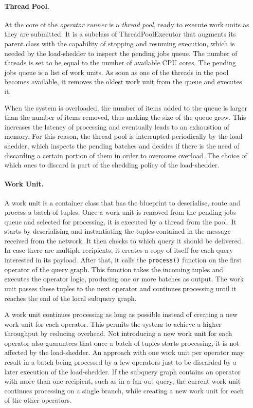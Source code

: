 \paragraph{Thread Pool.}
At the core of the \emph{operator runner} is a \emph{thread pool}, ready to execute work units as
they are submitted. It is a subclass of ThreadPoolExecutor that augments its parent class with the
capability of stopping and resuming execution, which is needed by the load-shedder to inspect the pending
jobs queue. The number of threads is set to be equal to the number of available CPU cores. The pending
jobs queue is a list of work units. As soon as one of the threads in the pool becomes available, it
removes the oldest work unit from the queue and executes it. 

When the system is overloaded, the number of items added to the queue is
larger than the number of items removed, thus making the size of the queue grow. This increases the
latency of processing and eventually leads to an exhaustion of memory. For this reason, the thread
pool is interrupted periodically by the load-shedder, which inspects the pending batches and decides if
there is the need of discarding a certain portion of them in order to overcome overload. The choice
of which ones to discard is part of the shedding policy of the load-shedder.
\vspace{-10pt}
\paragraph{Work Unit.}
A work unit is a container class that has the blueprint to deserialise, route
and process a batch of tuples. Once a work unit is removed from the pending jobs queue and selected
for processing, it is executed by a thread from the pool. 
It starts by deserialising and instantiating the tuples contained in the message received
from the network. It then checks to which query it should be delivered. In case there are multiple
recipients, it creates a copy of itself for each query interested in its payload. After that, it calls
the \texttt{process()} function on the first operator of the query graph. This function takes the
incoming tuples and executes the operator logic, producing one or more batches as output. The work unit
passes these tuples to the next operator and continues processing until it reaches the end of the local subquery
graph. 

A work unit continues processing as long as possible instead of creating a
new work unit for each operator. This permits the system to achieve a higher throughput by reducing
overhead.
Not introducing a new work unit for each operator also guarantees that once a batch of tuples starts
processing, it is not affected by the load-shedder. An approach with one work unit per operator
may result in a batch being processed by a few operators just to be discarded by a later
execution of the load-shedder. If the subquery graph contains an operator with more than one recipient,
such as in a fan-out query, the current work unit continues processing on a single branch, while
creating a new work unit for each of the other operators. 

